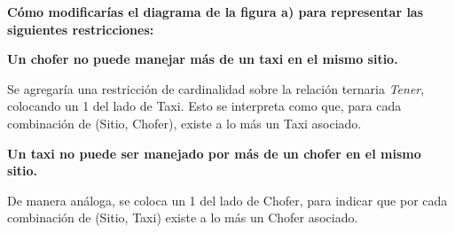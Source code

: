 \item \textbf{Cómo modificarías el diagrama de la figura a) para representar las siguientes restricciones:}

\textbf{Un chofer no puede manejar más de un taxi en el mismo sitio.}

Se agregaría una restricción de cardinalidad sobre la relación ternaria \textit{Tener}, colocando un 1 del lado de Taxi. Esto se interpreta como que, para cada combinación de (Sitio, Chofer), existe a lo más un Taxi asociado.

\textbf{Un taxi no puede ser manejado por más de un chofer en el mismo sitio.}

De manera análoga, se coloca un 1 del lado de Chofer, para indicar que por cada combinación de (Sitio, Taxi) existe a lo más un Chofer asociado.
